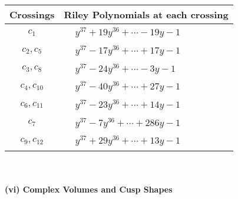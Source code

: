\documentclass[1p]{elsarticle_modified}
\theoremstyle{definition}
\begin{document}
\begin{tabular}{m{50pt}|m{274pt}}
Crossings & \hspace{64pt}Riley Polynomials at each crossing \\
\hline $$\begin{aligned}c_{1}\end{aligned}$$&$\begin{aligned}
&y^{37}+19 y^{36}+\cdots-19 y-1
\end{aligned}$\\
\hline $$\begin{aligned}c_{2},c_{5}\end{aligned}$$&$\begin{aligned}
&y^{37}-17 y^{36}+\cdots+17 y-1
\end{aligned}$\\
\hline $$\begin{aligned}c_{3},c_{8}\end{aligned}$$&$\begin{aligned}
&y^{37}-24 y^{36}+\cdots-3 y-1
\end{aligned}$\\
\hline $$\begin{aligned}c_{4},c_{10}\end{aligned}$$&$\begin{aligned}
&y^{37}-40 y^{36}+\cdots+27 y-1
\end{aligned}$\\
\hline $$\begin{aligned}c_{6},c_{11}\end{aligned}$$&$\begin{aligned}
&y^{37}-23 y^{36}+\cdots+14 y-1
\end{aligned}$\\
\hline $$\begin{aligned}c_{7}\end{aligned}$$&$\begin{aligned}
&y^{37}-7 y^{36}+\cdots+286 y-1
\end{aligned}$\\
\hline $$\begin{aligned}c_{9},c_{12}\end{aligned}$$&$\begin{aligned}
&y^{37}+29 y^{36}+\cdots+13 y-1
\end{aligned}$\\
\hline
\end{tabular}\\~\\
\newpage\flushleft \textbf{(vi) Complex Volumes and Cusp Shapes}
\end{document}
